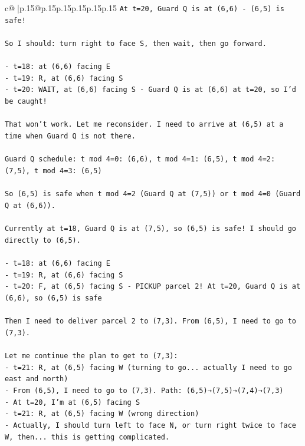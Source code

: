 \documentclass{article}
\begin{document}
{\begin{supertabular}{c@{$\;$}|p{.15\linewidth}@{}p{.15\linewidth}p{.15\linewidth}p{.15\linewidth}p{.15\linewidth}p{.15\linewidth}}
{{{\texttt{At t=20, Guard Q is at (6,6) {-} (6,5) is safe!} \\
\\ 
\texttt{So I should: turn right to face S, then wait, then go forward.} \\
\\ 
\texttt{{-} t=18: at (6,6) facing E} \\
\texttt{{-} t=19: R, at (6,6) facing S} \\
\texttt{{-} t=20: WAIT, at (6,6) facing S {-} Guard Q is at (6,6) at t=20, so I'd be caught!} \\
\\ 
\texttt{That won't work. Let me reconsider. I need to arrive at (6,5) at a time when Guard Q is not there.} \\
\\ 
\texttt{Guard Q schedule: t mod 4=0: (6,6), t mod 4=1: (6,5), t mod 4=2: (7,5), t mod 4=3: (6,5)} \\
\\ 
\texttt{So (6,5) is safe when t mod 4=2 (Guard Q at (7,5)) or t mod 4=0 (Guard Q at (6,6)).} \\
\\ 
\texttt{Currently at t=18, Guard Q is at (7,5), so (6,5) is safe! I should go directly to (6,5).} \\
\\ 
\texttt{{-} t=18: at (6,6) facing E} \\
\texttt{{-} t=19: R, at (6,6) facing S} \\
\texttt{{-} t=20: F, at (6,5) facing S {-} PICKUP parcel 2! At t=20, Guard Q is at (6,6), so (6,5) is safe} \\
\\ 
\texttt{Then I need to deliver parcel 2 to (7,3). From (6,5), I need to go to (7,3).} \\
\\ 
\texttt{Let me continue the plan to get to (7,3):} \\
\texttt{{-} t=21: R, at (6,5) facing W (turning to go... actually I need to go east and north)} \\
\texttt{{-} From (6,5), I need to go to (7,3). Path: (6,5)→(7,5)→(7,4)→(7,3)} \\
\texttt{{-} At t=20, I'm at (6,5) facing S} \\
\texttt{{-} t=21: R, at (6,5) facing W (wrong direction)} \\
\texttt{{-} Actually, I should turn left to face N, or turn right twice to face W, then... this is getting complicated.} \\
}}}
\end{supertabular}}
\end{document}
